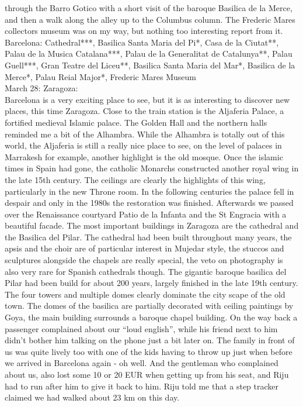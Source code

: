 through the Barro Gotico with a short visit of the baroque Basilica de la Merce, and then a walk along the alley up to the Columbus column. The Frederic Mares collectors museum was on my way, but nothing too interesting report from it. \\

Barcelona: Cathedral***, Basilica Santa Maria del Pi*, Casa de la Ciutat**, Palau de la Musica Catalana***, Palau de la Generalitat de Catalunya**, Palau Guell***, Gran Teatre del Liceu**, Basilica Santa Maria del Mar*, Basilica de la Merce*, Palau Reial Major*,  Frederic Mares Museum\\

March 28: Zaragoza:\\
Barcelona is a very exciting place to see, but it is as interesting to discover new places, this time Zaragoza. Close to the train station is the Aljaferia Palace, a fortified medieval Islamic palace. The Golden Hall and the northern halls reminded me a bit of the Alhambra. While the Alhambra is totally out of this world, the Aljaferia is still a really nice place to see, on the level of palaces in Marrakesh for example, another highlight is the old mosque. Once the islamic times in Spain had gone, the catholic Monarchs constructed another royal wing in the late 15th century. The ceilings are clearly the highlights of this wing, particularly in the new Throne room. In the following centuries the palace fell in despair and only in the 1980s the restoration was finished.
Afterwards we passed over the Renaissance courtyard Patio de la Infanta and the St Engracia with a beautiful facade. The most important buildings in Zaragoza are the cathedral and the Basilica del Pilar. The cathedral had been built throughout many years, the apsis and the choir are of particular interest in Mujedar style, the stuccos and sculptures alongside the chapels are really special, the veto on photography is also very rare for Spanish cathedrals though. The gigantic baroque basilica del Pilar had been build for about 200 years, largely finished in the late 19th century. The four towers and multiple domes clearly dominate the city scape of the old town. The domes of the basilica are partially decorated with ceiling paintings by Goya, the main building surrounds a baroque chapel building. 
On the way back a passenger complained about our ``loud english'', while his friend next to him didn't bother him talking on the phone just a bit later on. The family in front of us was quite lively too with one of the kids having to throw up just when before we arrived in Barcelona again - oh well. And the gentleman who complained about us, also lost some 10 or 20 EUR when getting up from his seat, and Riju had to run after him to give it back to him. Riju told me that a step tracker claimed we had walked about 23 km on this day.\\

